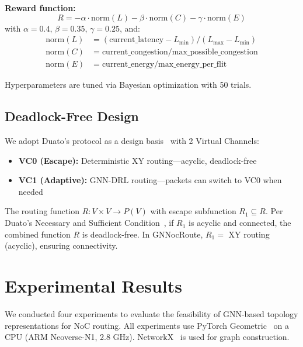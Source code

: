 \documentclass[conference]{IEEEtran}
\begin{document}
\textbf{Reward function:}
\begin{equation}
R = -\alpha\cdot\text{norm}(L) - \beta\cdot\text{norm}(C) - \gamma\cdot\text{norm}(E)
\label{eq:reward}
\end{equation}
with $\alpha=0.4$, $\beta=0.35$, $\gamma=0.25$, and:
\begin{align}
\text{norm}(L) &= (\text{current\_latency} - L_{\min})/(L_{\max} - L_{\min}) \nonumber\\
\text{norm}(C) &= \text{current\_congestion} / \text{max\_possible\_congestion} \nonumber\\
\text{norm}(E) &= \text{current\_energy} / \text{max\_energy\_per\_flit} \nonumber
\end{align}

Hyperparameters are tuned via Bayesian optimization with 50 trials.

\subsection{Deadlock-Free Design}
\label{sec:deadlock}

We adopt Duato's protocol as a design basis~\cite{duato1996} with 2 Virtual Channels:
\begin{itemize}
 \item \textbf{VC0 (Escape):} Deterministic XY routing---acyclic, deadlock-free
 \item \textbf{VC1 (Adaptive):} GNN-DRL routing---packets can switch to VC0 when needed
\end{itemize}

The routing function $R: V\times V\to P(V)$ with escape subfunction $R_1\subseteq R$. Per Duato's Necessary and Sufficient Condition~\cite{duato1996}, if $R_1$ is acyclic and connected, the combined function $R$ is deadlock-free. In GNNocRoute, $R_1 =$ XY routing (acyclic), ensuring connectivity.

\section{Experimental Results}
\label{sec:results}

We conducted four experiments to evaluate the feasibility of GNN-based topology representations for NoC routing. All experiments use PyTorch Geometric~\cite{pyg2019} on a CPU (ARM Neoverse-N1, 2.8 GHz). NetworkX~\cite{networkx2008} is used for graph construction.
\end{document}
